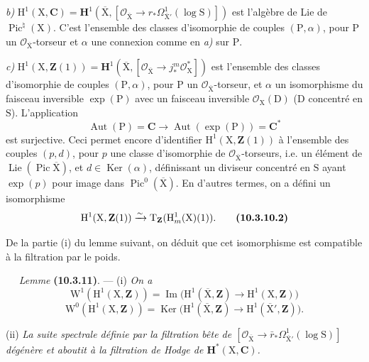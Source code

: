 \documentclass[11pt,leqno]{article}
\newcommand{\Page}[1]{\ifvmode\noindent\else\unskip\ \fi{\footnotesize\textcolor{gray}{[p.\,#1]}}\ \ignorespaces}
\begin{document}
\textit{b)} \(\mathrm{H}^{1}(\mathrm{X},\mathbf{C})=\mathbf{H}^{1}(\overline{\mathrm{X}},[\mathcal{O}_{\overline{\mathrm{X}}}\to r_*\Omega^{1}_{\overline{\mathrm{X}}'}(\log\mathrm{S})])\) est l’algèbre de Lie de \(\operatorname{Pic}^{\natural}(\mathrm{X})\). C’est l’ensemble des classes d’isomorphie de couples \((\mathrm{P},\alpha)\), pour \(\mathrm{P}\) un \(\mathcal{O}_{\overline{\mathrm{X}}}\)-torseur et \(\alpha\) une connexion comme en \textit{a)} sur \(\mathrm{P}\).

\textit{c)} \(\mathrm{H}^{1}(\mathrm{X},\mathbf{Z}(1))=\mathbf{H}^{1}(\overline{\mathrm{X}},[\mathcal{O}_{\overline{\mathrm{X}}}\to j_*^{m}\mathcal{O}_{\mathrm{X}}^{*}])\) est l’ensemble des classes d’isomorphie de couples \((\mathrm{P},\alpha)\), pour \(\mathrm{P}\) un \(\mathcal{O}_{\overline{\mathrm{X}}}\)-torseur, et \(\alpha\) un isomorphisme du faisceau inversible \(\exp(\mathrm{P})\) avec un faisceau inversible \(\mathcal{O}_{\mathrm{X}}(\mathrm{D})\) (\(\mathrm{D}\) concentré en \(\mathrm{S}\)). L’application
\[
\operatorname{Aut}(\mathrm{P})=\mathbf{C}
\longrightarrow\operatorname{Aut}(\exp(\mathrm{P}))=\mathbf{C}^{*}
\]
est surjective. Ceci permet encore d’identifier \(\mathrm{H}^{1}(\mathrm{X},\mathbf{Z}(1))\) à l’ensemble des couples \((p,d)\), pour \(p\) une classe d’isomorphie de \(\mathcal{O}_{\overline{\mathrm{X}}}\)-torseurs, i.e. un élément de \(\operatorname{Lie}(\operatorname{Pic}\overline{\mathrm{X}})\), et \(d\in\operatorname{Ker}(\alpha)\), définissant un diviseur concentré en \(\mathrm{S}\) ayant \(\exp(p)\) pour image dans \(\operatorname{Pic}^{0}(\overline{\mathrm{X}})\). En d’autres termes, on a défini un isomorphisme
\[
\mathrm{H}^{1}(\mathrm{X},\mathbf{Z}(1))
\xrightarrow{\sim}
\mathrm{T}_{\mathbf{Z}}(\mathrm{H}^{1}_{m}(\mathrm{X})(1)).
\tag*{\textbf{(10.3.10.2)}}
\]

De la partie (i) du lemme suivant, on déduit que cet isomorphisme est compatible à la filtration par le poids.

\Page{73}
\textit{Lemme} \textbf{(10.3.11)}. — (i) \textit{On a}
\[
\mathrm{W}^{1}(\mathrm{H}^{1}(\mathrm{X},\mathbf{Z}))
=\operatorname{Im}\bigl(
\mathrm{H}^{1}(\overline{\mathrm{X}},\mathbf{Z})
\to\mathrm{H}^{1}(\mathrm{X},\mathbf{Z})\bigr)
\]
\[
\mathrm{W}^{0}(\mathrm{H}^{1}(\mathrm{X},\mathbf{Z}))
=\operatorname{Ker}\bigl(
\mathrm{H}^{1}(\overline{\mathrm{X}},\mathbf{Z})
\to\mathrm{H}^{1}(\overline{\mathrm{X}}',\mathbf{Z})\bigr).
\]

(ii) \textit{La suite spectrale définie par la filtration bête de
\([\mathcal{O}_{\overline{\mathrm{X}}}\to
\bar r_*\Omega^{1}_{\overline{\mathrm{X}}'}(\log\mathrm{S})]\)
dégénère et aboutit à la filtration de Hodge de
\(\mathbf{H}^{*}(\mathrm{X},\mathbf{C})\).}
\end{document}
